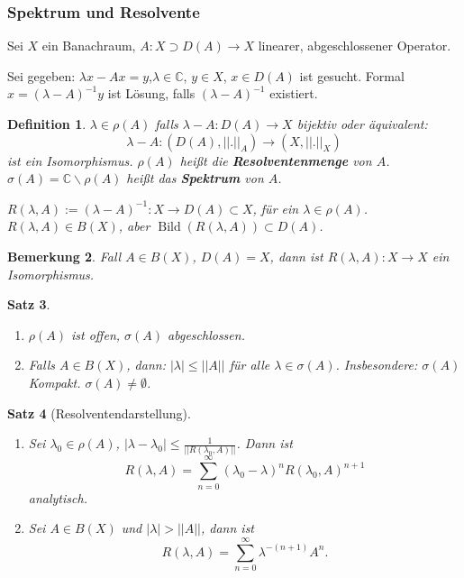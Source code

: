 \documentclass[12pt]{extreport} %
\newtheorem{Satz}{Satz}[subsection]
\newtheorem{Definition}[Satz]{Definition}
\newtheorem{Bemerkung}[Satz]{Bemerkung}
\DeclareMathOperator{\Bild}{Bild}
\numberwithin{equation}{section}
\newcommand{\C}{\mathbb{C}} %
\begin{document}
	\subsubsection{Spektrum und Resolvente}
	
	Sei $X$ ein Banachraum, $A:X\supset D(A)\rightarrow X$ linearer, abgeschlossener Operator.
	
	Sei gegeben: $\lambda x-Ax=y$,$\lambda\in \C$, $y\in X$, $x\in D(A)$ ist gesucht. Formal $x=(\lambda-A)^{-1}y$ ist Lösung, falls $(\lambda-A)^{-1}$ existiert.
	
	\begin{Definition}
		$\lambda\in \rho(A)$ falls $\lambda -A: D(A)\rightarrow X$ bijektiv oder äquivalent: 
		$$\lambda-A:(D(A),||.||_A)\rightarrow (X,||.||_X)$$
		ist ein Isomorphismus. $\rho(A)$ heißt die \textbf{Resolventenmenge} von $A$. $\sigma(A)=\C\backslash\rho(A)$ heißt das \textbf{Spektrum} von $A$.
		
		$R(\lambda, A):= (\lambda-A)^{-1}: X\rightarrow D(A)\subset X$, für ein $\lambda\in \rho(A)$. $R(\lambda,A)\in B(X)$, aber $\Bild(R(\lambda,A))\subset D(A)$.
	\end{Definition}
	
	\begin{Bemerkung}
		Fall $A\in B(X)$, $D(A) = X$, dann ist $R(\lambda, A): X\rightarrow X$ ein 
		Isomorphismus.
	\end{Bemerkung}
	
	\begin{Satz}~
		\begin{enumerate}
			\item[a)] $\rho(A)$ ist offen, $\sigma(A)$ abgeschlossen.
			\item[b)] Falls $A\in B(X)$, dann: $|\lambda|\leq ||A||$ für alle $\lambda\in \sigma(A)$. Insbesondere: $\sigma(A)$ Kompakt. $\sigma(A)\neq\emptyset$.
		\end{enumerate}
	\end{Satz}
	
	\begin{Satz}[Resolventendarstellung]~
		\begin{enumerate}
			\item[a)] Sei $\lambda_0\in \rho(A)$, $|\lambda-\lambda_0|\leq\frac{1}{||R(\lambda_0,A)||}$. Dann ist
			$$R(\lambda,A) =\sum_{n = 0}^{\infty} (\lambda_0-\lambda)^n R(\lambda_0, A)^{n+1}$$
			analytisch.
			\item[b)] Sei $A\in B(X)$ und $|\lambda|>||A||$, dann ist 
			$$R(\lambda, A) = \sum_{n = 0}^{\infty}\lambda^{-(n+1)}A^n.$$ 
		\end{enumerate}
	\end{Satz}
	
\end{document}

